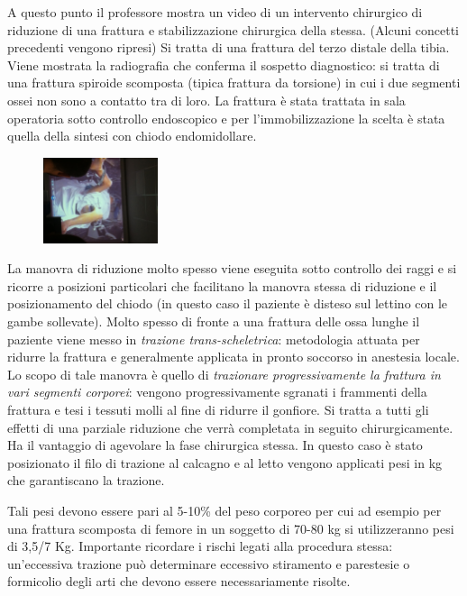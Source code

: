 A questo punto il professore mostra un video di un intervento chirurgico di riduzione di una frattura e stabilizzazione chirurgica della stessa.
(Alcuni concetti precedenti vengono ripresi) Si tratta di una frattura del terzo distale della tibia. Viene mostrata la radiografia che conferma il sospetto diagnostico: si tratta di una frattura spiroide
scomposta (tipica frattura da torsione) in cui i due segmenti ossei non sono a contatto tra di loro. La frattura è stata trattata in sala operatoria sotto controllo endoscopico e per l'immobilizzazione la
scelta è stata quella della sintesi con chiodo endomidollare.

\begin{figure}[!ht]
\centering
\includegraphics[width=0.3\textwidth]{001/image8.jpeg}
\end{figure}

La manovra di riduzione molto spesso viene eseguita sotto controllo dei raggi e si ricorre a posizioni particolari che facilitano la manovra stessa di riduzione e il posizionamento del chiodo (in questo caso il paziente è disteso sul lettino con le gambe sollevate). Molto spesso di fronte a una frattura delle ossa lunghe il paziente viene messo in \emph{trazione trans-scheletrica}: metodologia attuata per ridurre la
frattura e generalmente applicata in pronto soccorso in anestesia locale. Lo scopo di tale manovra è quello di \emph{trazionare progressivamente la frattura in vari segmenti corporei}: vengono progressivamente sgranati i frammenti della frattura e tesi i tessuti molli al fine di ridurre il gonfiore. Si tratta a tutti gli effetti di una parziale riduzione che verrà completata in seguito chirurgicamente. Ha il vantaggio di agevolare la fase chirurgica stessa. In questo caso è
stato posizionato il filo di trazione al calcagno e al letto vengono applicati pesi in kg che garantiscano la trazione.

Tali pesi devono essere pari al 5-10\% del peso corporeo per cui ad esempio per una frattura scomposta di femore in un soggetto di 70-80 kg si utilizzeranno pesi di 3,5/7 Kg. Importante ricordare i rischi legati
alla procedura stessa: un'eccessiva trazione può determinare eccessivo stiramento e parestesie o formicolio degli arti che devono essere necessariamente risolte.

